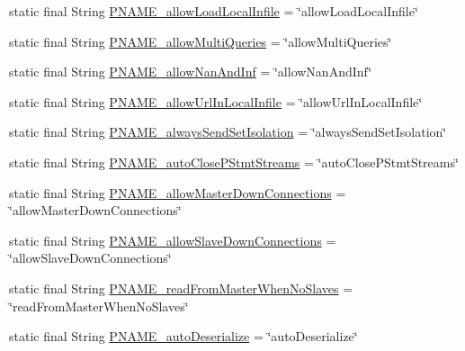\begin{DoxyCompactItemize}
static final String \mbox{\hyperlink{classcom_1_1mysql_1_1cj_1_1conf_1_1_property_definitions_a2aaab6dc9f3c1dcdca005e79715dcef0}{P\+N\+A\+M\+E\+\_\+allow\+Load\+Local\+Infile}} = \char`\"{}allow\+Load\+Local\+Infile\char`\"{}
\item 
static final String \mbox{\hyperlink{classcom_1_1mysql_1_1cj_1_1conf_1_1_property_definitions_a7fa319167190c7ccf5710033344c1047}{P\+N\+A\+M\+E\+\_\+allow\+Multi\+Queries}} = \char`\"{}allow\+Multi\+Queries\char`\"{}
\item 
static final String \mbox{\hyperlink{classcom_1_1mysql_1_1cj_1_1conf_1_1_property_definitions_ab75310233a5aab7d2401840e45237bc8}{P\+N\+A\+M\+E\+\_\+allow\+Nan\+And\+Inf}} = \char`\"{}allow\+Nan\+And\+Inf\char`\"{}
\item 
static final String \mbox{\hyperlink{classcom_1_1mysql_1_1cj_1_1conf_1_1_property_definitions_a4a28905e92fafa3551fa7f0a0ab1509c}{P\+N\+A\+M\+E\+\_\+allow\+Url\+In\+Local\+Infile}} = \char`\"{}allow\+Url\+In\+Local\+Infile\char`\"{}
\item 
static final String \mbox{\hyperlink{classcom_1_1mysql_1_1cj_1_1conf_1_1_property_definitions_a35228890151f69807856f0fc44c9b086}{P\+N\+A\+M\+E\+\_\+always\+Send\+Set\+Isolation}} = \char`\"{}always\+Send\+Set\+Isolation\char`\"{}
\item 
static final String \mbox{\hyperlink{classcom_1_1mysql_1_1cj_1_1conf_1_1_property_definitions_a67a0d14b36ec0a0f97e351667805f637}{P\+N\+A\+M\+E\+\_\+auto\+Close\+P\+Stmt\+Streams}} = \char`\"{}auto\+Close\+P\+Stmt\+Streams\char`\"{}
\item 
static final String \mbox{\hyperlink{classcom_1_1mysql_1_1cj_1_1conf_1_1_property_definitions_a86a40eee220920b0fc55ca260d0217ae}{P\+N\+A\+M\+E\+\_\+allow\+Master\+Down\+Connections}} = \char`\"{}allow\+Master\+Down\+Connections\char`\"{}
\item 
static final String \mbox{\hyperlink{classcom_1_1mysql_1_1cj_1_1conf_1_1_property_definitions_a3b5dc1ba1d84b1757a6c8db990cfebe6}{P\+N\+A\+M\+E\+\_\+allow\+Slave\+Down\+Connections}} = \char`\"{}allow\+Slave\+Down\+Connections\char`\"{}
\item 
static final String \mbox{\hyperlink{classcom_1_1mysql_1_1cj_1_1conf_1_1_property_definitions_ad17163a0213e8ea1efcd559046900157}{P\+N\+A\+M\+E\+\_\+read\+From\+Master\+When\+No\+Slaves}} = \char`\"{}read\+From\+Master\+When\+No\+Slaves\char`\"{}
\item 
static final String \mbox{\hyperlink{classcom_1_1mysql_1_1cj_1_1conf_1_1_property_definitions_ab3efc775d4d19fa8553c518063f45596}{P\+N\+A\+M\+E\+\_\+auto\+Deserialize}} = \char`\"{}auto\+Deserialize\char`\"{}

\end{DoxyCompactItemize}
